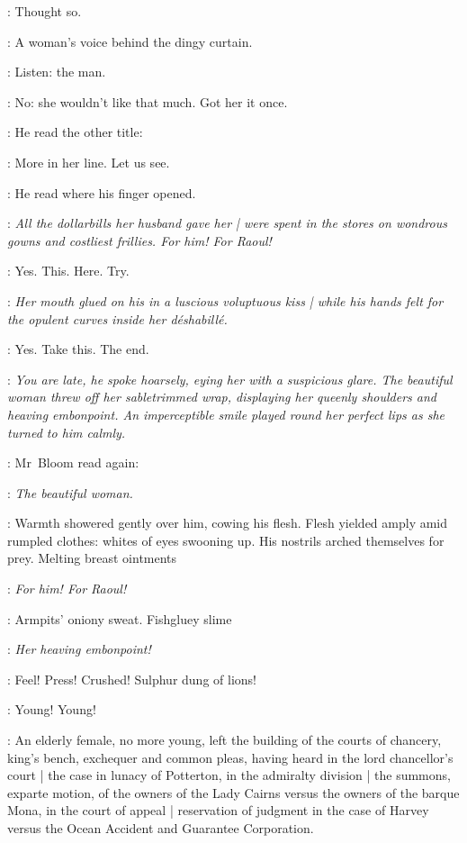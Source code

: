 \BloomInt:
Thought so.

:
A woman's voice behind the dingy curtain.

\BloomInt:
Listen: the man.

\BloomInt:
No:
she wouldn't like that much.
Got her it once.

:
He read the other title:

\BloomInt:
More in her line.
Let us see.

:
He read where his finger opened.

\book:
\emph{All the dollarbills her husband gave her |
were spent in the stores
on wondrous gowns and costliest frillies.
For him!
For Raoul!}

\BloomInt:
Yes.
This.%
Here.
Try.

\book:
\emph{Her mouth glued on his in a luscious voluptuous kiss |
while his hands felt for the opulent curves inside her déshabillé.}

\BloomInt:
Yes.
Take this.
The end.

\book:
\emph{You are late,
he spoke hoarsely,
eying her with a suspicious glare.
The beautiful woman threw off her sabletrimmed wrap,
displaying her queenly shoulders and heaving embonpoint.
An imperceptible smile played round her perfect lips
as she turned to him calmly.}

:
Mr~Bloom read again:

\book:
\emph{The beautiful woman.}

\BloomInt:
Warmth showered gently over him,
cowing his flesh.
Flesh yielded amply amid rumpled clothes:%
whites of eyes swooning up.
His nostrils arched themselves for prey.
Melting breast ointments

\book:
\emph{For him!
For Raoul!}

\BloomInt:
Armpits' oniony sweat.
Fishgluey slime

\book:
\emph{Her heaving embonpoint!}

\BloomInt:
Feel!
Press!
Crushed!
Sulphur dung of lions!

\BloomInt:
Young!
Young!

\begin{interject}
    :
    An elderly female,
    no more young,
    left the building of the courts of chancery,
    king's bench,
    exchequer
    and common pleas,
    having heard in the lord chancellor's court |
    the case in lunacy of Potterton,
    in the admiralty division |
    the summons,
    exparte motion,
    of the owners of the Lady Cairns
    versus the owners of the barque Mona,
    in the court of appeal |
    reservation of judgment
    in the case of Harvey versus
    the Ocean Accident and Guarantee Corporation.
\end{interject}%

